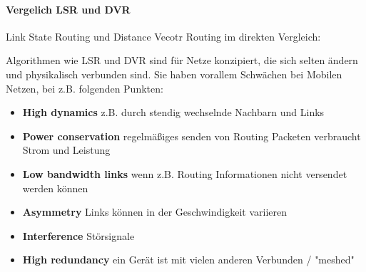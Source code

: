 		\paragraph{Vergelich LSR und DVR}
		Link State Routing und Distance Vecotr Routing im direkten Vergleich:
		\begin{table}[h]
		\end{table}

		Algorithmen wie LSR und DVR sind für Netze konzipiert, die sich selten ändern und physikalisch verbunden sind. Sie haben vorallem Schwächen bei Mobilen Netzen, bei z.B. folgenden Punkten:

		\begin{itemize}
			\item \textbf{High dynamics} z.B. durch stendig wechselnde Nachbarn und Links
			\item \textbf{Power conservation} regelmäßiges senden von Routing Packeten verbraucht Strom und Leistung
			\item \textbf{Low bandwidth links} wenn z.B. Routing Informationen nicht versendet werden können
			\item \textbf{Asymmetry} Links können in der Geschwindigkeit variieren
			\item \textbf{Interference} Störsignale
			\item \textbf{High redundancy} ein Gerät ist mit vielen anderen Verbunden / "meshed"
		\end{itemize}

